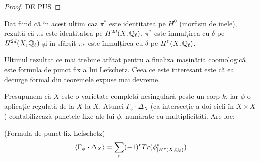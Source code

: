 \documentclass[13pt,openany]{book}
\begin{document}
\begin{proof}
DE PUS
\end{proof}

Dat fiind că în acest ultim caz $\pi^*$ este identitatea pe $H^0$ (morfism de inele), rezultă că $\pi_*$ este identitatea pe $H^{2d}(X,\mathbb{Q}_\ell)$, $\pi^*$ este înmulțirea cu $\delta$ pe $H^{2d}(X,\mathbb{Q}_\ell)$ și în sfârșit $\pi_*$ este înmulțirea cu $\delta$ pe $H^0(X,\mathbb{Q}_\ell)$.

Ultimul rezultat ce mai trebuie arătat pentru a finaliza mașinăria coomologică este formula de punct fix a lui Lefschetz. Ceea ce este interesant este că ea decurge formal din teoremele expuse mai devreme.

Presupunem că $X$ este o varietate completă nesingulară peste un corp $k$, iar $\phi$ o aplicație regulată de la $X$ la $X$. Atunci $\Gamma_\phi \cdot \Delta_X$ (ca intersecție a doi cicli în $X \times X$) contabilizează punctele fixe ale lui $\phi$, numărate cu multiplicități. Are loc:

\begin{teo}
(Formula de punct fix Lefschetz)
$$\langle \Gamma_\phi \cdot \Delta_X \rangle = \sum\limits_r (-1)^r Tr(\phi^*_{\mid H^r(X,\mathbb{Q}_\ell)})$$
\end{teo}
\end{document}
